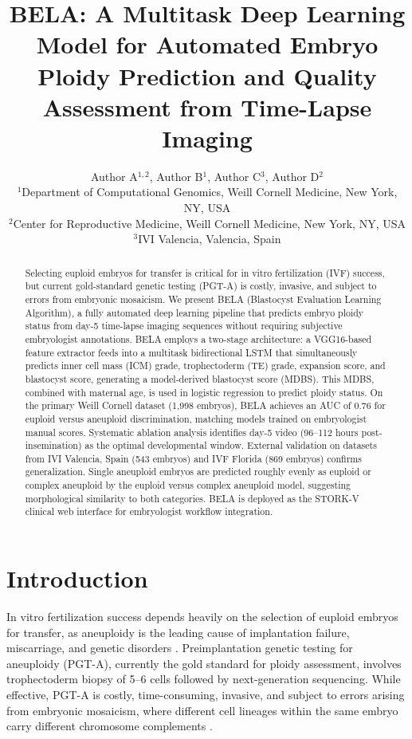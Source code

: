 \documentclass[11pt]{article}
\title{BELA: A Multitask Deep Learning Model for Automated Embryo Ploidy Prediction and Quality Assessment from Time-Lapse Imaging}
\author{Author A$^{1,2}$, Author B$^{1}$, Author C$^{3}$, Author D$^{2}$ \\
\small $^{1}$Department of Computational Genomics, Weill Cornell Medicine, New York, NY, USA \\
\small $^{2}$Center for Reproductive Medicine, Weill Cornell Medicine, New York, NY, USA \\
\small $^{3}$IVI Valencia, Valencia, Spain}
\date{}
\begin{document}
\maketitle

\begin{abstract}
Selecting euploid embryos for transfer is critical for in vitro fertilization (IVF) success, but current gold-standard genetic testing (PGT-A) is costly, invasive, and subject to errors from embryonic mosaicism. We present BELA (Blastocyst Evaluation Learning Algorithm), a fully automated deep learning pipeline that predicts embryo ploidy status from day-5 time-lapse imaging sequences without requiring subjective embryologist annotations. BELA employs a two-stage architecture: a VGG16-based feature extractor feeds into a multitask bidirectional LSTM that simultaneously predicts inner cell mass (ICM) grade, trophectoderm (TE) grade, expansion score, and blastocyst score, generating a model-derived blastocyst score (MDBS). This MDBS, combined with maternal age, is used in logistic regression to predict ploidy status. On the primary Weill Cornell dataset (1,998 embryos), BELA achieves an AUC of 0.76 for euploid versus aneuploid discrimination, matching models trained on embryologist manual scores. Systematic ablation analysis identifies day-5 video (96--112 hours post-insemination) as the optimal developmental window. External validation on datasets from IVI Valencia, Spain (543 embryos) and IVF Florida (869 embryos) confirms generalization. Single aneuploid embryos are predicted roughly evenly as euploid or complex aneuploid by the euploid versus complex aneuploid model, suggesting morphological similarity to both categories. BELA is deployed as the STORK-V clinical web interface for embryologist workflow integration.
\end{abstract}

\section{Introduction}

In vitro fertilization success depends heavily on the selection of euploid embryos for transfer, as aneuploidy is the leading cause of implantation failure, miscarriage, and genetic disorders \citep{hassold2001error, franasiak2014ploidy}. Preimplantation genetic testing for aneuploidy (PGT-A), currently the gold standard for ploidy assessment, involves trophectoderm biopsy of 5--6 cells followed by next-generation sequencing. While effective, PGT-A is costly, time-consuming, invasive, and subject to errors arising from embryonic mosaicism, where different cell lineages within the same embryo carry different chromosome complements \citep{greco2015healthy}.
\end{document}
